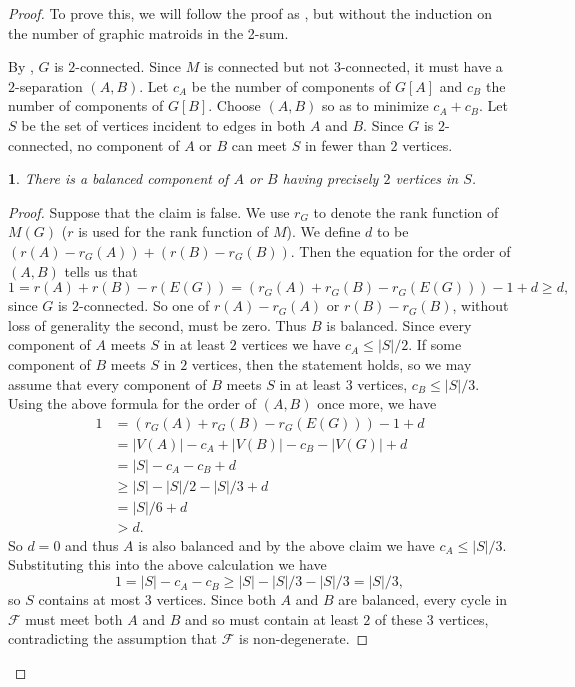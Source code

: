 \documentclass[12pt]{article}
\newtheorem{claim}{}[theorem]
\theoremstyle{definition}
\theoremstyle{plain} %
\begin{document}
\begin{proof}
To prove this, we will follow the proof as \cite[Theorem 4.8]{Bowler-Funk-Slilaty20}, but without the induction on the number of graphic matroids in the 2-sum. 

By \cite[Theorem 4.6]{Bowler-Funk-Slilaty20}, $G$ is $2$-connected. Since $M$ is connected but not $3$-connected, it must have a $2$-separation $(A,B)$. Let $c_A$ be the number of components of $G[A]$ and $c_B$ the number of components of $G[B]$. Choose $(A,B)$ so as to minimize $c_A + c_B$. Let $S$ be the set of vertices incident to edges in both $A$ and $B$. Since $G$ is $2$-connected, no component of $A$ or $B$ can meet $S$ in fewer than $2$ vertices.

\begin{claim}
    There is a balanced component of $A$ or $B$ having precisely $2$ vertices in $S$.
\end{claim} 
\begin{proof}
Suppose that the claim is false.
We use $r_G$ to denote the rank function of $M(G)$ ($r$ is used for the rank function of $M$). We define $d$ to be $(r(A) - r_G(A)) + (r(B) - r_G(B))$. Then the equation for the order of $(A,B)$ tells us that
\[
1 = r(A) + r(B) - r(E(G)) = (r_G(A) + r_G(B) - r_G(E(G))) - 1 + d \ge d,
\]
since $G$ is $2$-connected. So one of $r(A) - r_G(A)$ or $r(B) - r_G(B)$, without loss of generality the second, must be zero. Thus $B$ is balanced. Since every component of $A$ meets $S$ in at least $2$ vertices we have $c_A \le |S|/2$. 
If some component of $B$ meets $S$ in $2$ vertices, then the statement holds, so we may assume that every component of $B$ meets $S$ in at least $3$ vertices,  $c_B \le |S|/3$. Using the above formula for the order of $(A,B)$ once more, we have
\begin{align*}
1 &= (r_G(A) + r_G(B) - r_G(E(G))) - 1 + d \\
&= |V(A)| - c_A + |V(B)| - c_B - |V(G)| + d \\ 
&= |S| - c_A - c_B + d \\
&\ge |S| - |S|/2 - |S|/3 + d \\
&= |S|/6 + d \\
&> d.
\end{align*}
So $d = 0$ and thus $A$ is also balanced and by the above claim we have $c_A \le |S|/3$. Substituting this into the above calculation we have
\[
1 = |S| - c_A - c_B \ge |S| - |S|/3 - |S|/3 = |S|/3,
\]
so $S$ contains at most $3$ vertices. Since both $A$ and $B$ are balanced, every cycle in $\mathcal{F}$ must meet both $A$ and $B$ and so must contain at least $2$ of these $3$ vertices, contradicting the assumption that $\mathcal{F}$ is non-degenerate.
\end{proof}



\end{proof}
\end{document}
